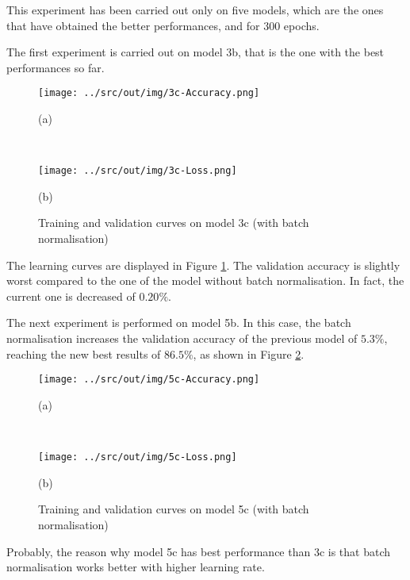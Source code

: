 \documentclass[a4paper,12pt]{article} %
\begin{document}
	This experiment has been carried out only on five models, which are the 
	ones that have obtained the better performances, and for 300 epochs.
	\newline
	
	The first experiment is carried out on model 3b, that is the one with the 
	best performances so far. 
	
	\begin{figure}[htb]
		\begin{minipage}[c]{.49\textwidth}
			\centering
			\texttt{[image: ../src/out/img/3c-Accuracy.png]}
			\caption*{(a)}
		\end{minipage}
		~
		\begin{minipage}[c]{.49\textwidth}
			\centering
			\texttt{[image: ../src/out/img/3c-Loss.png]}
			\caption*{(b)}
		\end{minipage}
		\caption{Training and validation curves on model 3c (with batch 
			normalisation)}
		\label{fig:model3c-performance}
	\end{figure}

	The learning curves are displayed in Figure \ref{fig:model3c-performance}. 
	The validation accuracy is slightly worst compared to the one of the model 
	without batch normalisation. In fact, the current one is decreased of 
	$0.20\%$.
	\newline
		
	The next experiment is performed on model 5b. In this case, the batch 
	normalisation increases the validation accuracy of the previous model of 
	$5.3\%$, reaching the new best results of $86.5\%$, as shown in Figure 
	\ref{fig:model5c-performance}.

	\begin{figure}[htb]
		\begin{minipage}[c]{.49\textwidth}
			\centering
			\texttt{[image: ../src/out/img/5c-Accuracy.png]}
			\caption*{(a)}
		\end{minipage}
		~
		\begin{minipage}[c]{.49\textwidth}
			\centering
			\texttt{[image: ../src/out/img/5c-Loss.png]}
			\caption*{(b)}
		\end{minipage}
		\caption{Training and validation curves on model 5c (with batch 
			normalisation)}
		\label{fig:model5c-performance}
	\end{figure}
	
	Probably, the reason why model 5c has best performance than 3c is that 
	batch normalisation works better with higher learning rate.
	\newline
	
\end{document}
